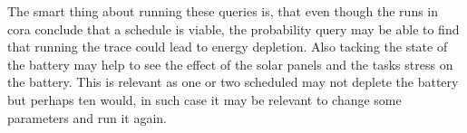 The smart thing about running these queries is, that even though the runs in \gls{cora} conclude that a schedule is viable, the probability query may be able to find that running the trace could lead to energy depletion. Also tacking the state of the battery may help to see the effect of the solar panels and the tasks stress on the battery. This is relevant as one or two scheduled may not deplete the battery but perhaps ten would, in such case it may be relevant to change some parameters and run it again.

